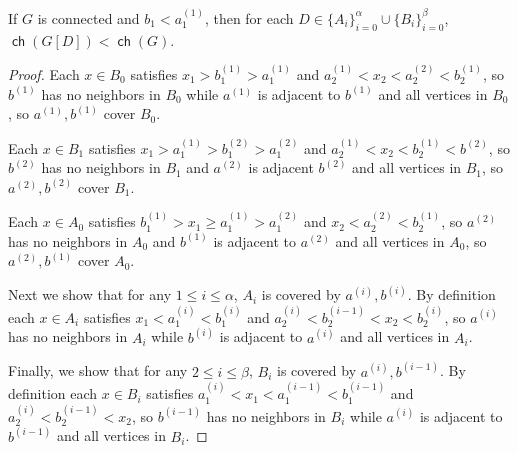 \documentclass{article}
\DeclareMathOperator\ch{\mathsf{ch}}
\begin{document}
\begin{proposition}
	\label{prop:permutation main chain}
	If $G$ is connected and $b_1 < a^{(1)}_1$, then
	for each $D \in \{A_i\}^{\alpha}_{i=0} \cup \{B_i\}_{i=0}^{\beta}$, $\ch(G[D]) < \ch(G)$.
\end{proposition}
\begin{proof}
	Each $x \in B_0$ satisfies $x_1 > b^{(1)}_1 > a^{(1)}_1$ and $a^{(1)}_2 < x_2 < a^{(2)}_2 <
	b^{(1)}_2$, so $b^{(1)}$ has no neighbors in $B_0$ while $a^{(1)}$ is adjacent to $b^{(1)}$ and all
	vertices in $B_0$, so $a^{(1)},b^{(1)}$ cover $B_0$.
	
	Each $x \in B_1$ satisfies $x_1 > a^{(1)}_1 > b^{(2)}_1 > a^{(2)}_1$ and $a^{(1)}_2 < x_2 <
	b^{(1)}_2 < b^{(2)}$, so $b^{(2)}$ has no neighbors in $B_1$ and $a^{(2)}$ is adjacent $b^{(2)}$ and
	all vertices in $B_1$, so $a^{(2)}, b^{(2)}$ cover $B_1$.
	
	Each $x \in A_0$ satisfies $b^{(1)}_1 > x_1 \geq a^{(1)}_1 > a^{(2)}_1$ and $x_2 < a^{(2)}_2 <
	b^{(1)}_2$, so $a^{(2)}$ has no neighbors in $A_0$ and $b^{(1)}$ is adjacent to $a^{(2)}$ and all
	vertices in $A_0$, so $a^{(2)}, b^{(1)}$ cover $A_0$.
	
	Next we show that for any $1 \leq i \leq \alpha$, $A_i$ is covered by $a^{(i)}, b^{(i)}$. By
	definition each $x \in A_i$ satisfies $x_1 < a^{(i)}_1 < b^{(i)}_1$ and $a^{(i)}_2 < b^{(i-1)}_2 <
	x_2 < b^{(i)}_2$, so $a^{(i)}$ has no neighbors in $A_i$ while $b^{(i)}$ is adjacent to $a^{(i)}$
	and all vertices in $A_i$.
	
	Finally, we show that for any $2 \leq i \leq \beta$, $B_i$ is covered by $a^{(i)}, b^{(i-1)}$. By
	definition each $x \in B_i$ satisfies $a^{(i)}_1 < x_1 < a^{(i-1)}_1 < b^{(i-1)}_1$ and $a^{(i)}_2 <
	b^{(i-1)}_2 < x_2$, so $b^{(i-1)}$ has no neighbors in $B_i$ while $a^{(i)}$ is adjacent
	to $b^{(i-1)}$ and all vertices in $B_i$.
\end{proof}
\end{document}
